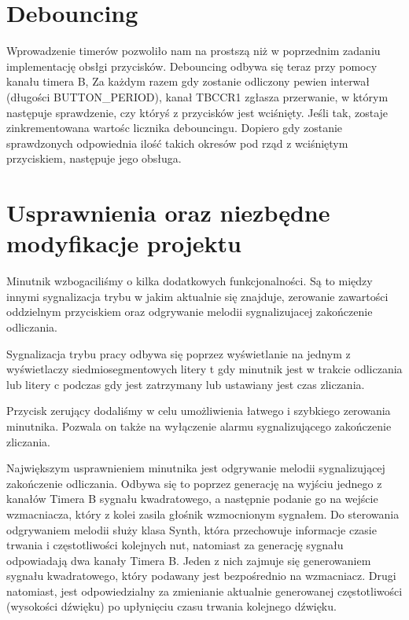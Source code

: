 \documentclass[fleqn]{article}
\begin{document}
\section{Debouncing}
Wprowadzenie timerów pozwoliło nam na prostszą niż w poprzednim zadaniu implementację obsłgi przycisków. Debouncing odbywa się teraz przy pomocy kanału timera B, Za każdym razem gdy zostanie odliczony pewien interwał (długości BUTTON\_PERIOD), kanał TBCCR1 zgłasza przerwanie, w którym następuje sprawdzenie, czy któryś z przycisków jest wciśnięty. Jeśli tak, zostaje zinkrementowana wartośc licznika debouncingu. Dopiero gdy zostanie sprawdzonych odpowiednia ilość takich okresów pod rząd z wciśniętym przyciskiem, następuje jego obsługa.

\section{Usprawnienia oraz niezbędne modyfikacje projektu}

Minutnik wzbogaciliśmy o kilka dodatkowych funkcjonalności. Są to między innymi sygnalizacja trybu w jakim aktualnie się znajduje, zerowanie zawartości oddzielnym przyciskiem oraz odgrywanie melodii sygnalizujacej zakończenie odliczania.

Sygnalizacja trybu pracy odbywa się poprzez wyświetlanie na jednym z wyświetlaczy siedmiosegmentowych litery t gdy minutnik jest w trakcie odliczania lub litery c podczas gdy jest zatrzymany lub ustawiany jest czas zliczania.

Przycisk zerujący dodaliśmy w celu umożliwienia łatwego i szybkiego zerowania minutnika. Pozwala on także na wyłączenie alarmu sygnalizującego zakończenie zliczania.

Największym usprawnieniem minutnika jest odgrywanie melodii sygnalizującej zakończenie odliczania. Odbywa się to poprzez generację na wyjściu jednego z kanałów Timera B sygnału kwadratowego, a następnie podanie go na wejście wzmacniacza, który z kolei zasila głośnik wzmocnionym sygnałem. Do sterowania odgrywaniem melodii służy klasa Synth, która przechowuje informacje czasie trwania i częstotliwości kolejnych nut, natomiast za generację sygnału odpowiadają dwa kanały Timera B. Jeden z nich zajmuje się generowaniem sygnału kwadratowego, który podawany jest bezpośrednio na wzmacniacz. Drugi natomiast, jest odpowiedzialny za zmienianie aktualnie generowanej częstotliwości (wysokości dźwięku) po upłynięciu czasu trwania kolejnego dźwięku.

\pagebreak
\end{document}
